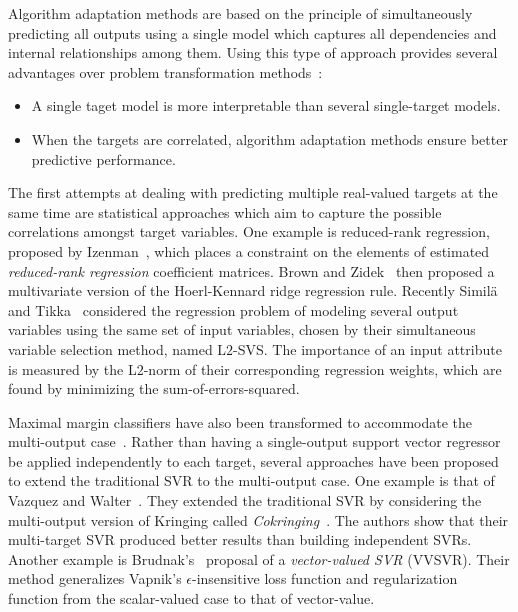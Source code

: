 \documentclass[reqno]{vcuthesis}
\newcommand{\iitem}{\item[-]}
\numberwithin{equation}{chapter}
\begin{document}
Algorithm adaptation methods are based on the principle of simultaneously predicting all outputs using a single model which captures all dependencies and internal relationships among them. Using this type of approach provides several advantages over problem transformation methods~\cite{breiman1997predicting,kocev2009using,simila2007input}:
\begin{itemize}
\iitem A single taget model is more interpretable than several single-target models.
\iitem When the targets are correlated, algorithm adaptation methods ensure better predictive performance.
\end{itemize}

The first attempts at dealing with predicting multiple real-valued targets at the same time are statistical approaches which aim to capture the possible correlations amongst target variables. One example is reduced-rank regression, proposed by Izenman~\cite{izenman1975reduced}, which places a constraint on the elements of estimated \textit{reduced-rank regression} coefficient matrices. Brown and Zidek~\cite{brown1980adaptive} then proposed a multivariate version of the Hoerl-Kennard ridge regression rule. Recently Simil{\"a} and Tikka~\cite{simila2007input} considered the regression problem of modeling several output variables using the same set of input variables, chosen by their simultaneous variable selection method, named L$2$-SVS. The importance of an input attribute is measured by the L$2$-norm of their corresponding regression weights, which are found by minimizing the sum-of-errors-squared.

Maximal margin classifiers have also been transformed to accommodate the multi-output case~\cite{tsochantaridis2005large}. Rather than having a single-output support vector regressor be applied independently to each target, several approaches have been proposed to extend the traditional SVR to the multi-output case. One example is that of Vazquez and Walter~\cite{vazquez2003multi}. They extended the traditional SVR by considering the multi-output version of Kringing called \textit{Cokringing}~\cite{chiles1999}. The authors show that their multi-target SVR produced better results than building independent SVRs. Another example is Brudnak's~\cite{brudnak2006vector} proposal of a \textit{vector-valued SVR} (VVSVR). Their method generalizes Vapnik's $\epsilon$-insensitive loss function and regularization function from the scalar-valued case to that of vector-value.
\end{document}
